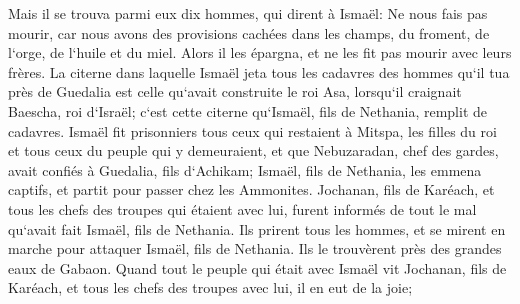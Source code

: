 \verse Mais il se trouva parmi eux dix hommes, qui dirent à Ismaël: Ne nous fais pas mourir, car nous avons des provisions cachées dans les champs, du froment, de l`orge, de l`huile et du miel. Alors il les épargna, et ne les fit pas mourir avec leurs frères. 
\verse La citerne dans laquelle Ismaël jeta tous les cadavres des hommes qu`il tua près de Guedalia est celle qu`avait construite le roi Asa, lorsqu`il craignait Baescha, roi d`Israël; c`est cette citerne qu`Ismaël, fils de Nethania, remplit de cadavres. 
\verse Ismaël fit prisonniers tous ceux qui restaient à Mitspa, les filles du roi et tous ceux du peuple qui y demeuraient, et que Nebuzaradan, chef des gardes, avait confiés à Guedalia, fils d`Achikam; Ismaël, fils de Nethania, les emmena captifs, et partit pour passer chez les Ammonites. 
\verse Jochanan, fils de Karéach, et tous les chefs des troupes qui étaient avec lui, furent informés de tout le mal qu`avait fait Ismaël, fils de Nethania. 
\verse Ils prirent tous les hommes, et se mirent en marche pour attaquer Ismaël, fils de Nethania. Ils le trouvèrent près des grandes eaux de Gabaon. 
\verse Quand tout le peuple qui était avec Ismaël vit Jochanan, fils de Karéach, et tous les chefs des troupes avec lui, il en eut de la joie; 
